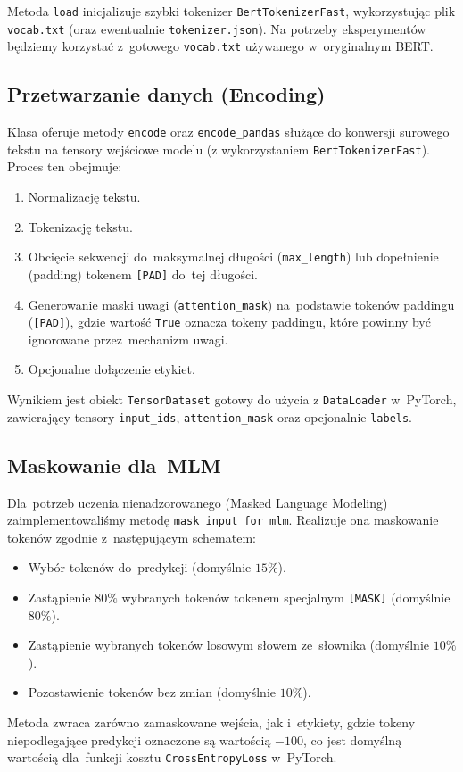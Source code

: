 \documentclass[a4paper,11pt,twoside]{report}
\theoremstyle{definition}
\begin{document}
Metoda \texttt{load} inicjalizuje szybki tokenizer \texttt{BertTokenizerFast}, wykorzystując plik \texttt{vocab.txt} (oraz ewentualnie \texttt{tokenizer.json}). Na potrzeby eksperymentów będziemy korzystać z~gotowego \texttt{vocab.txt} używanego w~oryginalnym BERT.

\subsection{Przetwarzanie danych (Encoding)}
Klasa oferuje metody \texttt{encode} oraz \texttt{encode\_pandas} służące do konwersji surowego tekstu na tensory wejściowe modelu (z wykorzystaniem \texttt{BertTokenizerFast}). Proces ten obejmuje:
\begin{enumerate}
    \item Normalizację tekstu.
    \item Tokenizację tekstu.
    \item Obcięcie sekwencji do~maksymalnej długości (\texttt{max\_length}) lub dopełnienie (padding) tokenem \texttt{[PAD]} do~tej długości.
    \item Generowanie maski uwagi (\texttt{attention\_mask}) na~podstawie tokenów paddingu (\texttt{[PAD]}), gdzie wartość \texttt{True} oznacza tokeny paddingu, które powinny być ignorowane przez~mechanizm uwagi.
    \item Opcjonalne dołączenie etykiet.
\end{enumerate}
Wynikiem jest obiekt \texttt{TensorDataset} gotowy do użycia z \texttt{DataLoader} w~PyTorch, zawierający tensory \texttt{input\_ids}, \texttt{attention\_mask} oraz opcjonalnie \texttt{labels}.

\subsection{Maskowanie dla~MLM}
Dla~potrzeb uczenia nienadzorowanego (Masked Language Modeling) zaimplementowaliśmy metodę \texttt{mask\_input\_for\_mlm}. Realizuje ona maskowanie tokenów zgodnie z~następującym schematem:
\begin{itemize}
    \item Wybór tokenów do~predykcji (domyślnie $15\%$).
    \item Zastąpienie $80\%$ wybranych tokenów tokenem specjalnym \texttt{[MASK]} (domyślnie $80\%$).
    \item Zastąpienie wybranych tokenów losowym słowem ze~słownika (domyślnie $10\%$).
    \item Pozostawienie tokenów bez zmian (domyślnie $10\%$).
\end{itemize}
Metoda zwraca zarówno zamaskowane wejścia, jak i~etykiety, gdzie tokeny niepodlegające predykcji oznaczone są wartością $-100$, co jest domyślną wartością dla~funkcji kosztu \texttt{CrossEntropyLoss} w~PyTorch.
\end{document}

